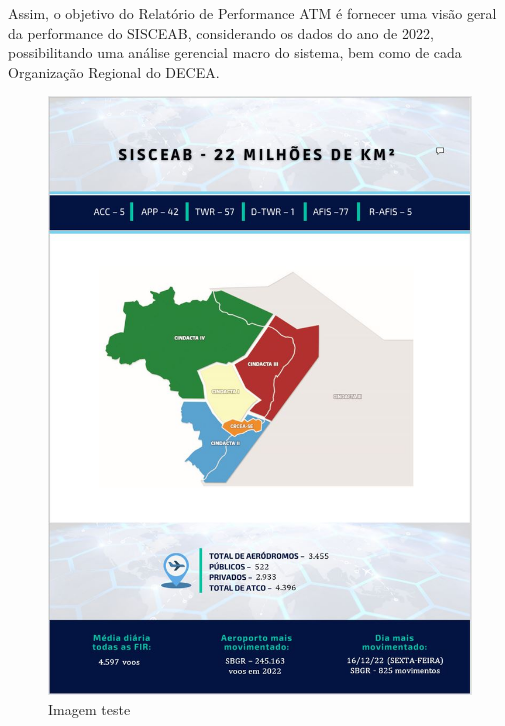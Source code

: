 \documentclass[
]{book}
\theoremstyle{definition}
\theoremstyle{definition}
\theoremstyle{definition}
\theoremstyle{definition}
\theoremstyle{remark}
\begin{document}
Assim, o objetivo do Relatório de Performance ATM é fornecer uma visão geral da performance do SISCEAB, considerando os dados do ano de 2022, possibilitando uma análise gerencial macro do sistema, bem como de cada Organização Regional do DECEA.

\begin{figure}
\centering
\includegraphics{imagens/fig2.jpg}
\caption{Imagem teste}
\end{figure}
\end{document}
